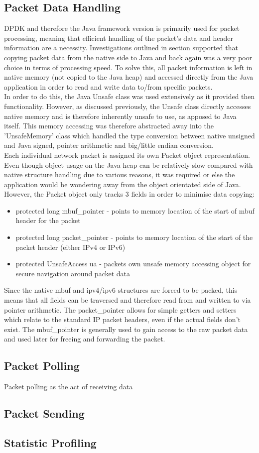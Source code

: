 \documentclass[final_report.tex]{subfiles}
\begin{document}
\subsection{Packet Data Handling}
DPDK and therefore the Java framework version is primarily used for packet processing, meaning that efficient handling of the packet's data and header information are a necessity. Investigations outlined in section  supported that copying packet data from the native side to Java and back again was a very poor choice in terms of processing speed. To solve this, all packet information is left in native memory (not copied to the Java heap) and accessed directly from the Java application in order to read and write data to/from specific packets. \\
\newline
In order to do this, the Java Unsafe class was used extensively as it provided then functionality. However, as discussed previously, the Unsafe class directly accesses native memory and is therefore inherently unsafe to use, as apposed to Java itself. This memory accessing was therefore abstracted away into the 'UnsafeMemory' class which handled the type conversion between native unsigned and Java signed, pointer arithmetic and big/little endian conversion. \\
\newline
Each individual network packet is assigned its own Packet object representation. Even though object usage on the Java heap can be relatively slow compared with native structure handling due to various reasons, it was required or else the application would be wondering away from the object orientated side of Java. However, the Packet object only tracks 3 fields in order to minimise data copying:

\begin{itemize}
	\item protected long mbuf\_pointer - points to memory location of the start of mbuf header for the packet
	\item protected long packet\_pointer - points to memory location of the start of the packet header (either IPv4 or IPv6)
	\item protected UnsafeAccess ua - packets own unsafe memory accessing object for secure navigation around packet data
\end{itemize}

Since the native mbuf and ipv4/ipv6 structures are forced to be packed,  this means that all fields can be traversed and therefore read from and written to via pointer arithmetic. The packet\_pointer allows for simple getters and setters which relate to the standard IP packet headers, even if the actual fields don't exist. The mbuf\_pointer is generally used to gain access to the raw packet data and used later for freeing and forwarding the packet.

\subsection{Packet Polling}
Packet polling as the act of receiving data 

\subsection{Packet Sending}

\subsection{Statistic Profiling}
\end{document}
